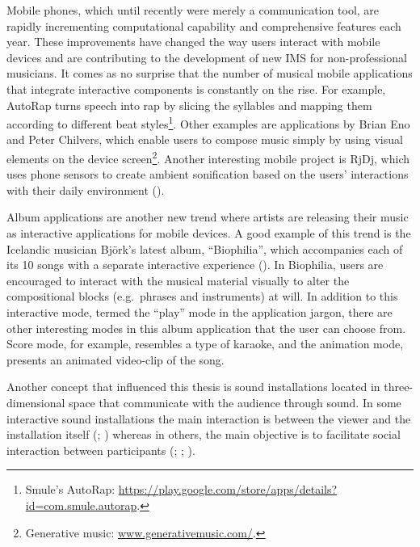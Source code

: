 \documentclass[a4paper,11pt]{article}
\begin{document}
Mobile phones, which until recently were merely a communication tool, are rapidly incrementing computational capability and comprehensive features each year.
These improvements have changed the way users interact with mobile devices and are contributing to the development of new IMS for non-professional musicians.
It comes as no surprise that the number of musical mobile applications that integrate interactive components is constantly on the rise.
For example, AutoRap turns speech into rap by slicing the syllables and mapping them according to different beat styles\footnote{Smule's AutoRap: \href{https://play.google.com/store/apps/details?id=com.smule.autorap}{https://play.google.com/store/apps/details?id=com.smule.autorap}.}.
Other examples are applications by Brian Eno and Peter Chilvers, which enable users to compose music simply by using visual elements on the device screen\footnote{Generative music: \href{http://www.generativemusic.com/}{www.generativemusic.com/}.}.
Another interesting mobile project is RjDj, which uses phone sensors to create ambient sonification based on the users' interactions with their daily environment (\cite{web:rjdj})\label{rjdj}.

Album applications are another new trend where artists are releasing their music as interactive applications for mobile devices.
A good example of this trend is the Icelandic musician Bj\"{o}rk's latest album, ``Biophilia'', which accompanies each of its 10 songs with a separate interactive experience (\cite{stimulant13}).
In Biophilia, users are encouraged to interact with the musical material visually to alter the compositional blocks (e.g.\ phrases and instruments) at will.
In addition to this interactive mode, termed the ``play'' mode in the application jargon, there are other interesting modes in this album application that the user can choose from.
Score mode, for example, resembles a type of karaoke, and the animation mode, presents an animated video-clip of the song.

Another concept that influenced this thesis is sound installations located in three-dimensional space that communicate with the audience through sound.
In some interactive sound installations the main interaction is between the viewer and the installation itself (\cite{web:visnjic}; \cite{web:cardiff01}) whereas in others, the main objective is to facilitate social interaction between participants (\cite{eng03}; \cite{web:kirn12}; \cite{web:murray-browne13}).
\end{document}
